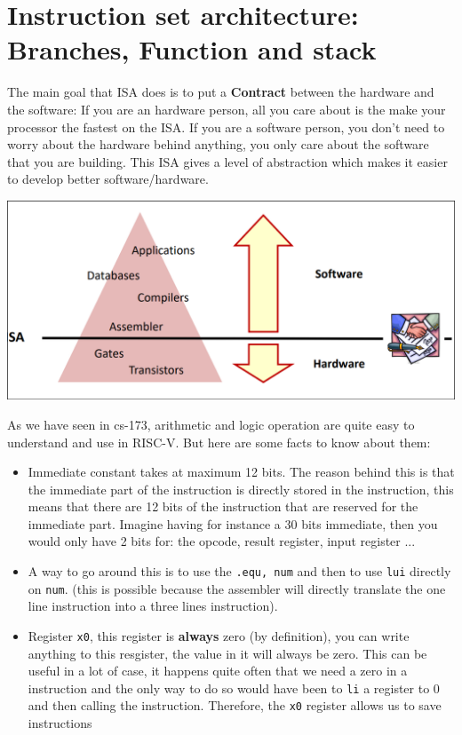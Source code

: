 
	\section{Instruction set architecture: Branches, Function and stack}
	The main goal that ISA does is to put a \textbf{Contract} between the hardware and the software: If you are an hardware person, all you care about is the make your processor the fastest on the ISA. If you are a software person, you don't need to worry about the hardware behind anything, you only care about the software that you are building. This ISA gives a level of abstraction which makes it easier to develop better software/hardware.
	\begin{center}
	\includegraphics[scale=0.3]{screenshots/2025-10-11_6.png}
	\end{center}
	As we have seen in cs-173, arithmetic and logic operation are quite easy to understand and use in RISC-V. But here are some facts to know about them:
	\begin{itemize}
		\item Immediate constant takes at maximum 12 bits. The reason behind this is that the immediate part of the instruction is directly stored in the instruction, this means that there are 12 bits of the instruction that are reserved for the immediate part. Imagine having for instance a 30 bits immediate, then you would only have 2 bits for: the opcode, result register, input register ... 
		\item A way to go around this is to use the \texttt{.equ, num} and then to use \texttt{lui} directly on \texttt{num}. (this is possible because the assembler will directly translate the one line instruction into a three lines instruction). 
		\item Register \texttt{x0}, this register is \textbf{always} zero (by definition), you can write anything to this resgister, the value in it will always be zero. This can be useful  in a lot of case, it happens quite often that we need a zero in a instruction and the only way to do so would have been to \texttt{li} a register to 0 and then calling the instruction. Therefore, the \texttt{x0} register allows us to save instructions
	\end{itemize}

